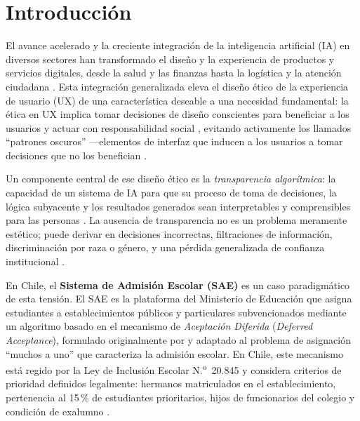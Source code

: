 \chapter{Introducción}\label{cap:introduccion}

El avance acelerado y la creciente integración de la inteligencia artificial (IA) en diversos sectores han transformado el diseño y la experiencia de productos y servicios digitales, desde la salud y las finanzas hasta la logística y la atención ciudadana \citep{strobel2019aspects}. Esta integración generalizada eleva el diseño ético de la experiencia de usuario (UX) de una característica deseable a una necesidad fundamental: la ética en UX implica tomar decisiones de diseño conscientes para beneficiar a los usuarios y actuar con responsabilidad social \citep{keepcoding2024etica}, evitando activamente los llamados ``patrones oscuros'' —elementos de interfaz que inducen a los usuarios a tomar decisiones que no los benefician \citep{checkealos2024etica}.

Un componente central de ese diseño ético es la \emph{transparencia algorítmica}: la capacidad de un sistema de IA para que su proceso de toma de decisiones, la lógica subyacente y los resultados generados sean interpretables y comprensibles para las personas \citep{ibm2024transparencia,transparenciaalgoritmica}. La ausencia de transparencia no es un problema meramente estético; puede derivar en decisiones incorrectas, filtraciones de información, discriminación por raza o género, y una pérdida generalizada de confianza institucional \citep{unir2024sesgo,skillnest_sesgo,agoro2019case}.

En Chile, el \textbf{Sistema de Admisión Escolar (SAE)} es un caso paradigmático de esta tensión. El SAE es la plataforma del Ministerio de Educación que asigna estudiantes a establecimientos públicos y particulares subvencionados mediante un algoritmo basado en el mecanismo de \emph{Aceptación Diferida} (\emph{Deferred Acceptance}), formulado originalmente por \citet{galeshapley1962} y adaptado al problema de asignación ``muchos a uno'' que caracteriza la admisión escolar. En Chile, este mecanismo está regido por la Ley de Inclusión Escolar N.\textsuperscript{o}~20.845 y considera criterios de prioridad definidos legalmente: hermanos matriculados en el establecimiento, pertenencia al 15\,\% de estudiantes prioritarios, hijos de funcionarios del colegio y condición de exalumno \citep{mineduc_sae,epstein2017mecanismos}.

